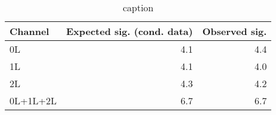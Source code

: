 \begin{table}[h]
  \centering
  \begin{tabular}{lrr}
    \toprule
    {\bfseries Channel}  & {\bfseries Expected sig. (cond. data)} & {\bfseries Observed sig.} \\
    \midrule
    0L         & 4.1               &	4.4	    \\
    1L         & 4.1               &	4.0	    \\
    2L         & 4.3               &	4.2	    \\
    0L+1L+2L   & 6.7               &	6.7	    \\
    \bottomrule
  \end{tabular}
  \caption{caption}
  \label{tab:sig_channels}
\end{table}